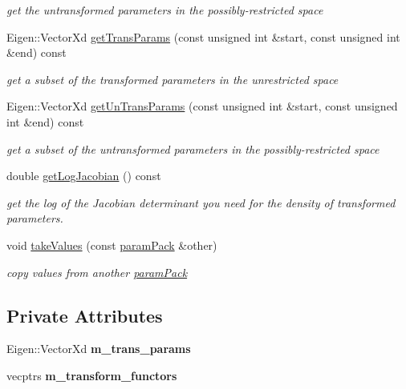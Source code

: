 \begin{DoxyCompactItemize}
\begin{DoxyCompactList}\small\item\em get the untransformed parameters in the possibly-\/restricted space \end{DoxyCompactList}\item 
Eigen\+::\+Vector\+Xd \hyperlink{classparamPack_aab8d550dbd4f28fce067197ba96f80fa}{get\+Trans\+Params} (const unsigned int \&start, const unsigned int \&end) const
\begin{DoxyCompactList}\small\item\em get a subset of the transformed parameters in the unrestricted space \end{DoxyCompactList}\item 
Eigen\+::\+Vector\+Xd \hyperlink{classparamPack_a0a2a21e73e3c8371e91db1b056317c46}{get\+Un\+Trans\+Params} (const unsigned int \&start, const unsigned int \&end) const
\begin{DoxyCompactList}\small\item\em get a subset of the untransformed parameters in the possibly-\/restricted space \end{DoxyCompactList}\item 
double \hyperlink{classparamPack_adb44adbc09eb281022984461fc2050f2}{get\+Log\+Jacobian} () const
\begin{DoxyCompactList}\small\item\em get the log of the Jacobian determinant you need for the density of transformed parameters. \end{DoxyCompactList}\item 
void \hyperlink{classparamPack_ac179e7541c993e05e5e435d5f20c558a}{take\+Values} (const \hyperlink{classparamPack}{param\+Pack} \&other)
\begin{DoxyCompactList}\small\item\em copy values from another \hyperlink{classparamPack}{param\+Pack} \end{DoxyCompactList}\end{DoxyCompactItemize}
\subsection*{Private Attributes}
\begin{DoxyCompactItemize}
\item 
\mbox{\label{classparamPack_a3b341549b133b3f0ac47d6c600b7bcff}} 
Eigen\+::\+Vector\+Xd {\bfseries m\+\_\+trans\+\_\+params}
\item 
\mbox{\label{classparamPack_a8f9043bb2a179abb7ea707e36de2cfc1}} 
vecptrs {\bfseries m\+\_\+transform\+\_\+functors}
\end{DoxyCompactItemize}


